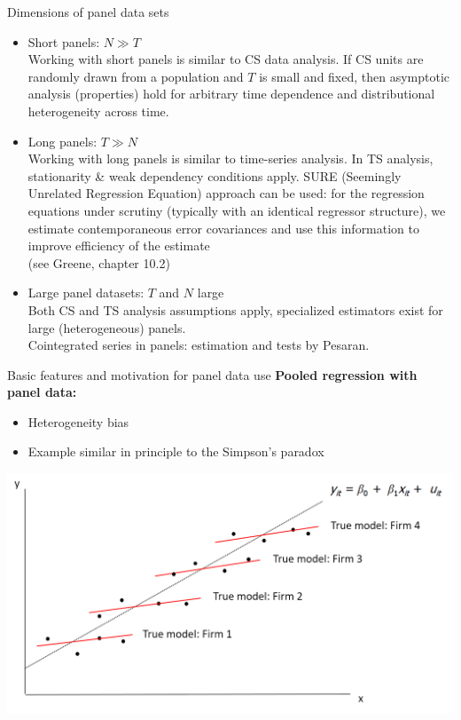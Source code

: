 \documentclass[usenames,dvipsnames]{beamer}
\begin{document}
\begin{frame}{Dimensions of panel data sets}
\footnotesize
\begin{itemize}
\item Short panels: $N \gg T$ \\
Working with short panels is similar to CS data analysis. If CS units are randomly drawn from a population and $T$ is small and fixed, then asymptotic analysis (properties) hold for arbitrary time dependence and distributional heterogeneity across time.
\medskip
\item Long panels: $T \gg N$ \\
Working with long panels is similar to time-series analysis. In TS analysis, stationarity \& weak dependency conditions apply. SURE (Seemingly Unrelated Regression Equation) approach can be used: for the regression equations under scrutiny (typically with an identical regressor structure), we estimate contemporaneous error covariances and use this information to improve efficiency of the estimate \\(see Greene, chapter 10.2)
\medskip
\item Large panel datasets: $T$ and $N$ large\\
Both CS and TS analysis assumptions apply, specialized estimators exist for large (heterogeneous) panels.\\Cointegrated series in panels: estimation and tests by Pesaran.
\end{itemize}
\end{frame}
\begin{frame}{Basic features and motivation for panel data use}
\textbf{Pooled regression with panel data:} \\ \medskip
\begin{itemize}
    \item Heterogeneity bias
    \medskip
    \item Example similar in principle to the Simpson's paradox
\end{itemize}
\medskip
\includegraphics[width=\textwidth]{./img/Obrazek4}
\end{frame}
\end{document}
